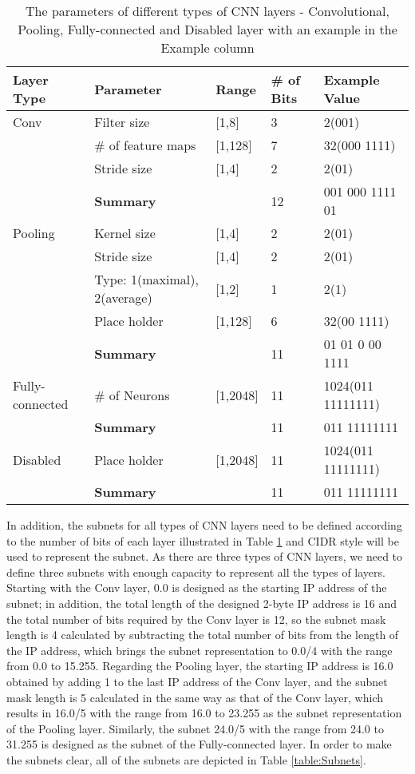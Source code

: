 \documentclass[conference]{IEEEtran}
\begin{document}
\begin{table}[!t]
	\renewcommand{\arraystretch}{1.3}
	\caption{The parameters of different types of CNN layers - Convolutional, Pooling, Fully-connected and Disabled layer with an example in the Example column}
	\label{table:CNNFields}
	\centering
	\begin{tabular}{|p{1.5cm}|p{1.5cm}|p{1cm}|p{0.5cm}|p{2cm}|}
		\hline
		Layer Type & Parameter & Range & \# of Bits & Example Value\\
		\hline
		Conv & Filter size & [1,8] & 3 & 2(001)\\
		\hline
		& \# of feature maps & [1,128] & 7 & 32(000 1111)\\
		\hline
		& Stride size & [1,4] & 2 & 2(01)\\
		\hline
		& \textbf{Summary} &  & 12 & 001 000 1111 01\\
		\hline
		Pooling & Kernel size & [1,4] & 2 & 2(01)\\
		\hline
		& Stride size & [1,4] & 2 & 2(01)\\
		\hline
		& Type: 1(maximal), 2(average) & [1,2] & 1 & 2(1)\\
		\hline
		& Place holder & [1,128] & 6 & 32(00 1111)\\
		\hline
		& \textbf{Summary} &  & 11 & 01 01 0 00 1111\\
		\hline
		Fully-connected & \# of Neurons & [1,2048] & 11 & 1024(011 11111111)\\
		\hline
		& \textbf{Summary} &  & 11 & 011 11111111\\
		\hline
		Disabled & Place holder & [1,2048] & 11 & 1024(011 11111111)\\
		\hline
		& \textbf{Summary} &  & 11 & 011 11111111\\
		\hline
	\end{tabular}
\end{table}


In addition, the subnets for all types of CNN layers need to be defined according to the number of bits of each layer illustrated in Table \ref{table:CNNFields} and CIDR style will be used to represent the subnet. As there are three types of CNN layers, we need to define three subnets with enough capacity to represent all the types of layers. Starting with the Conv layer, 0.0 is designed as the starting IP address of the subnet; in addition, the total length of the designed 2-byte IP address is 16 and the total number of bits required by the Conv layer is 12, so the subnet mask length is 4 calculated by subtracting the total number of bits from the length of the IP address, which brings the subnet representation to 0.0/4 with the range from 0.0 to 15.255. Regarding the Pooling layer, the starting IP address is 16.0 obtained by adding 1 to the last IP address of the Conv layer, and the subnet mask length is 5 calculated in the same way as that of the Conv layer, which results in 16.0/5 with the range from 16.0 to 23.255 as the subnet representation of the Pooling layer. Similarly, the subnet 24.0/5 with the range from 24.0 to 31.255 is designed as the subnet of the Fully-connected layer. In order to make the subnets clear, all of the subnets are depicted in Table \ref{table:Subnets}.
\end{document}
